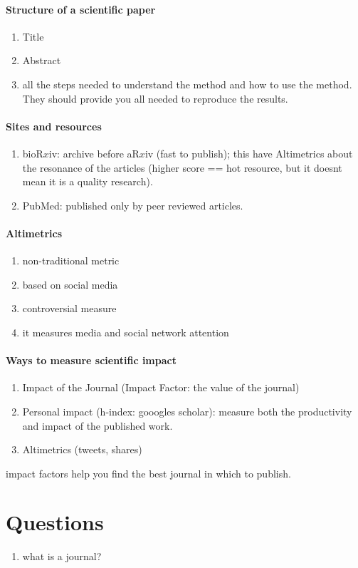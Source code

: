 \documentclass[11pt]{article}
\begin{document}
\paragraph{Structure of a scientific paper} %
\label{par:structure_of_a_scientific_paper}
\begin{enumerate}
	\item Title
	\item Abstract
	\item all the steps needed to understand the method and how to use the method. They should provide you all needed to reproduce the results.
\end{enumerate}

\paragraph{Sites and resources} %
\label{par:sites_and_resources}
\begin{enumerate}
	\item bioR$x$iv: archive before aR$x$iv (fast to publish); this have Altimetrics about the resonance of the articles (higher score == hot resource, but it doesnt mean it is a quality research).
	\item PubMed: published only by peer reviewed articles.
\end{enumerate}

\paragraph{Altimetrics} %
\label{par:altimetrics}
\begin{enumerate}
	\item non-traditional metric
	\item based on social media
	\item controversial measure
	\item it measures media and social network attention
\end{enumerate}

\paragraph{Ways to measure scientific impact} 
\label{par:ways_to_measure_scientific_impact}
\begin{enumerate}
	\item Impact of the Journal (Impact Factor: the value of the journal)
	\item Personal impact (h-index: gooogles scholar): measure both the productivity and impact of the published work.
	\item Altimetrics (tweets, shares)
\end{enumerate}
impact factors help you find the best journal in which to publish.



\section{Questions} %
\label{sec:questions}
\begin{enumerate}
	\item what is a journal?
\end{enumerate}
\end{document}
